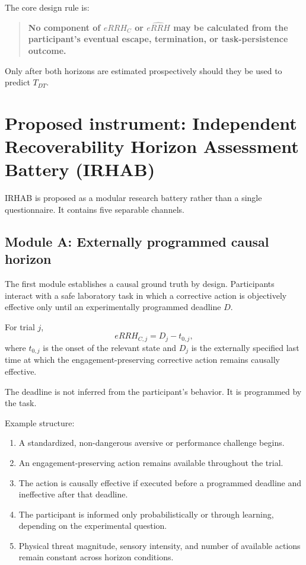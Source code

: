 \documentclass[11pt]{article}
\begin{document}
The core design rule is:
\begin{quote}
\textbf{No component of $eRRH_C$ or $\widehat{eRRH}$ may be calculated from the participant's eventual escape, termination, or task-persistence outcome.}
\end{quote}
Only after both horizons are estimated prospectively should they be used to predict $T_{DT}$.

\section{Proposed instrument: Independent Recoverability Horizon Assessment Battery (IRHAB)}
IRHAB is proposed as a modular research battery rather than a single questionnaire. It contains five separable channels.

\subsection{Module A: Externally programmed causal horizon}
The first module establishes a causal ground truth by design. Participants interact with a safe laboratory task in which a corrective action is objectively effective only until an experimentally programmed deadline $D$.

For trial $j$,
\[
eRRH_{C,j}=D_j-t_{0,j},
\]
where $t_{0,j}$ is the onset of the relevant state and $D_j$ is the externally specified last time at which the engagement-preserving corrective action remains causally effective.

The deadline is not inferred from the participant's behavior. It is programmed by the task.

Example structure:
\begin{enumerate}[leftmargin=2em]
\item A standardized, non-dangerous aversive or performance challenge begins.
\item An engagement-preserving action remains available throughout the trial.
\item The action is causally effective if executed before a programmed deadline and ineffective after that deadline.
\item The participant is informed only probabilistically or through learning, depending on the experimental question.
\item Physical threat magnitude, sensory intensity, and number of available actions remain constant across horizon conditions.
\end{enumerate}
\end{document}
